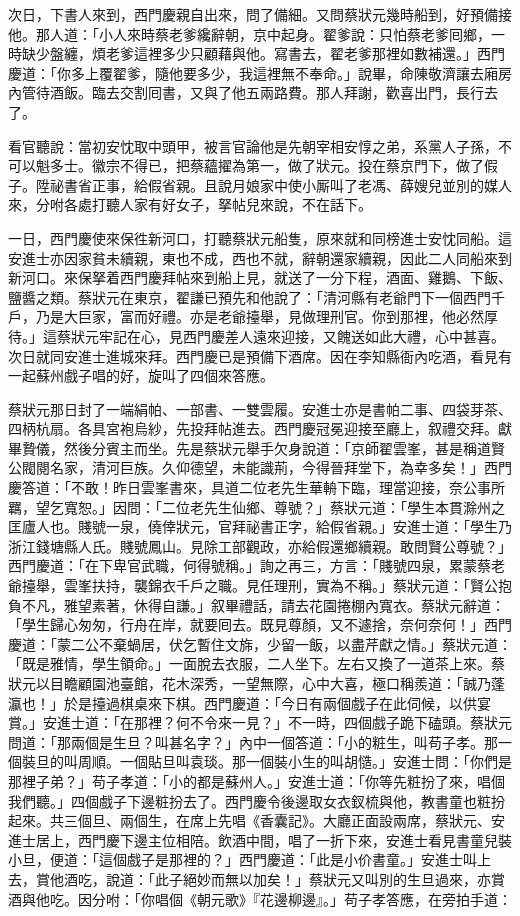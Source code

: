 次日，下書人來到，西門慶親自出來，問了備細。又問蔡狀元幾時船到，好預備接他。那人道：「小人來時蔡老爹纔辭朝，京中起身。翟爹說：只怕蔡老爹囘鄉，一時缺少盤纏，煩老爹這裡多少只顧藉與他。寫書去，翟老爹那裡如數補還。」西門慶道：「你多上覆翟爹，隨他要多少，我這裡無不奉命。」說畢，命陳敬濟讓去廂房內管待酒飯。臨去交割囘書，又與了他五兩路費。那人拜謝，歡喜出門，長行去了。

看官聽說：當初安忱取中頭甲，被言官論他是先朝宰相安惇之弟，系黨人子孫，不可以魁多士。徽宗不得已，把蔡蘊擢為第一，做了狀元。投在蔡京門下，做了假子。陞祕書省正事，給假省親。且說月娘家中使小厮叫了老馮、薛嫂兒並別的媒人來，分咐各處打聽人家有好女子，拏帖兒來說，不在話下。

一日，西門慶使來保徃新河口，打聽蔡狀元船隻，原來就和同榜進士安忱同船。這安進士亦因家貧未續親，東也不成，西也不就，辭朝還家續親，因此二人同船來到新河口。來保拏着西門慶拜帖來到船上見，就送了一分下程，酒面、雞鵝、下飯、鹽醬之類。蔡狀元在東京，翟謙已預先和他說了：「清河縣有老爺門下一個西門千戶，乃是大巨家，富而好禮。亦是老爺擡舉，見做理刑官。你到那裡，他必然厚待。」這蔡狀元牢記在心，{}見西門慶差人遠來迎接，又餽送如此大禮，心中甚喜。次日就同安進士進城來拜。西門慶已是預備下酒席。因在李知縣衙內吃酒，看見有一起蘇州戲子唱的好，旋叫了四個來答應。

蔡狀元那日封了一端絹帕、一部書、一雙雲履。安進士亦是書帕二事、四袋芽茶、四柄杭扇。各具宮袍烏紗，先投拜帖進去。西門慶冠冕迎接至廳上，叙禮交拜。獻畢贄儀，然後分賓主而坐。先是蔡狀元舉手欠身說道：「京師翟雲峯，{}甚是稱道賢公閥閱名家，清河巨族。久仰德望，未能識荊，今得晉拜堂下，為幸多矣！」西門慶答道：「不敢！昨日雲峯書來，具道二位老先生華輈下臨，理當迎接，奈公事所羈，望乞寬恕。」因問：「二位老先生仙鄉、尊號？」蔡狀元道：「學生本貫滁州之匡廬人也。賤號一泉，僥倖狀元，官拜祕書正字，給假省親。」安進士道：「學生乃浙江錢塘縣人氏。賤號鳳山。見除工部觀政，亦給假還鄉續親。敢問賢公尊號？」西門慶道：「在下卑官武職，何得號稱。」詢之再三，方言：「賤號四泉，累蒙蔡老爺擡舉，雲峯扶持，襲錦衣千戶之職。見任理刑，實為不稱。」蔡狀元道：「賢公抱負不凡，雅望素著，休得自謙。」叙畢禮話，請去花園捲棚內寬衣。蔡狀元辭道：「學生歸心匆匆，行舟在岸，就要囘去。既見尊顏，又不遽捨，奈何奈何！」{}西門慶道：「蒙二公不棄蝸居，伏乞暫住文旆，少留一飯，以盡芹獻之情。」蔡狀元道：「既是雅情，學生領命。」一面脫去衣服，二人坐下。左右又換了一道茶上來。蔡狀元以目瞻顧園池臺館，花木深秀，一望無際，心中大喜，極口稱羨道：「誠乃蓬瀛也！」於是擡過棋桌來下棋。西門慶道：「今日有兩個戲子在此伺候，以供宴賞。」安進士道：「在那裡？何不令來一見？」不一時，四個戲子跪下磕頭。蔡狀元問道：「那兩個是生旦？叫甚名字？」內中一個答道：「小的粧生，叫苟子孝。那一個裝旦的叫周順。一個貼旦叫袁琰。那一個裝小生的叫胡慥。」安進士問：「你們是那裡子弟？」苟子孝道：「小的都是蘇州人。」安進士道：「你等先粧扮了來，唱個我們聽。」四個戲子下邊粧扮去了。西門慶令後邊取女衣釵梳與他，教書童也粧扮起來。共三個旦、兩個生，在席上先唱《香囊記》。大廳正面設兩席，蔡狀元、安進士居上，西門慶下邊主位相陪。飲酒中間，唱了一折下來，安進士看見書童兒裝小旦，便道：「這個戲子是那裡的？」西門慶道：「此是小价書童。」安進士叫上去，賞他酒吃，說道：「此子絕妙而無以加矣！」蔡狀元又叫別的生旦過來，亦賞酒與他吃。因分咐：「你唱個《朝元歌》『花邊柳邊』。」苟子孝答應，在旁拍手道：

